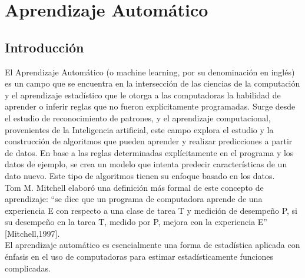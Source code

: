 \documentclass[a4paper,11pt,spanish]{book}
\begin{document}



  \section{Aprendizaje Automático}
    \subsection{Introducción}
      El Aprendizaje Automático (o machine learning, por su denominación en
      inglés) es un campo que se encuentra en la intersección de las ciencias de la computación y el aprendizaje estadístico que le otorga a las computadoras la habilidad de aprender o inferir reglas que no fueron explícitamente programadas.
      Surge desde el estudio de reconocimiento de patrones, y el aprendizaje computacional, provenientes de la Inteligencia artificial, este campo explora el estudio y la construcción de algoritmos
      que pueden aprender y realizar predicciones a partir de datos. En base a las reglas determinadas explícitamente en el programa y los datos de ejemplo, se crea un modelo que intenta predecir
      características de un dato nuevo. Este tipo de algoritmos tienen su enfoque basado en los datos.\\
      Tom M. Mitchell elaboró una definición más formal de este concepto de aprendizaje: “se dice que un programa de computadora aprende de una experiencia E con respecto a una clase
      de tarea T y medición de desempeño P, si su desempeño en la tarea T, medido por P, mejora con la experiencia E” [Mitchell,1997].\\
      El aprendizaje automático es esencialmente una forma de estadística aplicada con énfasis en el uso de computadoras para estimar estadísticamente funciones complicadas.
\end{document}
